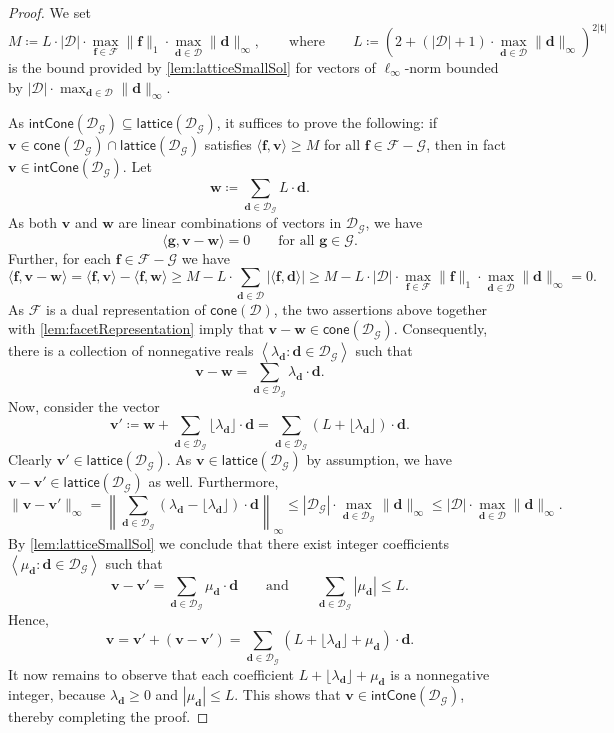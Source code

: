 \documentclass{article}
\renewcommand{\leq}{\leqslant}
\renewcommand{\geq}{\geqslant}
\newcommand{\Dd}{\mathcal{D}}
\newcommand{\tup}[1]{{\mathbf{#1}}}
\newcommand{\ww}{\tup w}
\newcommand{\tv}{\tup t}
\newcommand{\ff}{\tup f}
\renewcommand{\gg}{\tup g}
\newcommand{\dd}{\tup d}
\newcommand{\myvv}{\tup v} %
\newcommand{\mset}[1]{\left\langle #1\right\rangle}
\newcommand{\Ff}{\mathcal{F}}
\newcommand{\Gg}{\mathcal{G}}
\newcommand{\sca}[2]{\langle #1,#2\rangle}
\renewcommand{\setminus}{-}
\newcommand{\realcone}{\mathsf{cone}}
\newcommand{\intcone}{\mathsf{intCone}}
\newcommand{\lattice}{\mathsf{lattice}}
\begin{document}
\begin{proof}
 We set
 $$M\coloneqq L\cdot |\Dd|\cdot \max_{\ff\in \Ff}\|\ff\|_1\cdot \max_{\dd\in \Dd} \|\dd\|_\infty,\qquad \textrm{where}\qquad L\coloneqq \left(2+(|\Dd|+1)\cdot \max_{\dd\in \Dd} \|\dd\|_\infty\right)^{2|\tv|}$$
 is the bound provided by \cref{lem:latticeSmallSol} for vectors of $\ell_\infty$-norm bounded by $|\Dd|\cdot \max_{\dd\in \Dd} \|\dd\|_\infty$.

 As $\intcone(\Dd_\Gg)\subseteq \lattice(\Dd_\Gg)$, it suffices to prove the following: if $\myvv\in \realcone(\Dd_\Gg)\cap \lattice(\Dd_\Gg)$ satisfies $\sca{\ff}{\myvv}\geq M$ for all $\ff\in \Ff\setminus \Gg$, then in fact $\myvv\in \intcone(\Dd_\Gg)$. Let
 $$\ww\coloneqq \sum_{\dd\in \Dd_\Gg} L\cdot \dd.$$
 As both $\myvv$ and $\ww$ are linear combinations of vectors in $\Dd_\Gg$, we have
 $$\sca{\gg}{\myvv-\ww}=0\qquad\textrm{for all }\gg\in \Gg.$$
 Further, for each $\ff\in \Ff\setminus \Gg$ we have
 $$\sca{\ff}{\myvv-\ww}=\sca{\ff}{\myvv}-\sca{\ff}{\ww}\geq M-L\cdot \sum_{\dd\in \Dd} |\sca{\ff}{\dd}|\geq M-L\cdot |\Dd|\cdot \max_{\ff\in \Ff}\|\ff\|_1\cdot \max_{\dd\in \Dd} \|\dd\|_\infty=0.$$
 As $\Ff$ is a dual representation of $\realcone(\Dd)$, the two assertions above together with \cref{lem:facetRepresentation} imply that $\myvv-\ww\in \realcone(\Dd_\Gg)$. Consequently, there is a collection of nonnegative reals $\mset{\lambda_\dd\colon \dd\in \Dd_\Gg}$ such that
 $$\myvv-\ww=\sum_{\dd\in \Dd_\Gg} \lambda_\dd\cdot \dd.$$
 Now, consider the vector
 $$\myvv'\coloneqq \ww+\sum_{\dd\in \Dd_\Gg} \lfloor\lambda_\dd\rfloor\cdot \dd=\sum_{\dd\in \Dd_\Gg} (L+\lfloor\lambda_\dd\rfloor)\cdot \dd.$$
 Clearly $\myvv'\in \lattice(\Dd_\Gg)$. As $\myvv\in \lattice(\Dd_\Gg)$ by assumption, we have $\myvv-\myvv'\in \lattice(\Dd_\Gg)$ as well. Furthermore,
 $$\|\myvv-\myvv'\|_\infty = \left\|\sum_{\dd\in \Dd_\Gg} (\lambda_\dd-\lfloor \lambda_\dd\rfloor)\cdot \dd\right\|_\infty\leq |\Dd_\Gg|\cdot \max_{\dd\in \Dd_\Gg} \|\dd\|_\infty\leq |\Dd|\cdot \max_{\dd\in \Dd} \|\dd\|_\infty.$$
 By \cref{lem:latticeSmallSol} we conclude that there exist integer coefficients $\mset{\mu_\dd\colon \dd\in \Dd_\Gg}$ such that
 $$\myvv-\myvv'=\sum_{\dd\in \Dd_\Gg} \mu_\dd\cdot \dd\qquad \textrm{and}\qquad \sum_{\dd\in \Dd_\Gg} |\mu_\dd|\leq L.$$
 Hence,
 $$\myvv=\myvv'+(\myvv-\myvv')=\sum_{\dd\in \Dd_\Gg} (L+\lfloor\lambda_\dd\rfloor+\mu_\dd)\cdot \dd.$$
 It now remains to observe that each coefficient $L+\lfloor\lambda_\dd\rfloor+\mu_\dd$ is a nonnegative integer, because $\lambda_\dd\geq 0$ and $|\mu_\dd|\leq L$. This shows that $\myvv\in \intcone(\Dd_\Gg)$, thereby completing the proof.
\end{proof}
\end{document}
